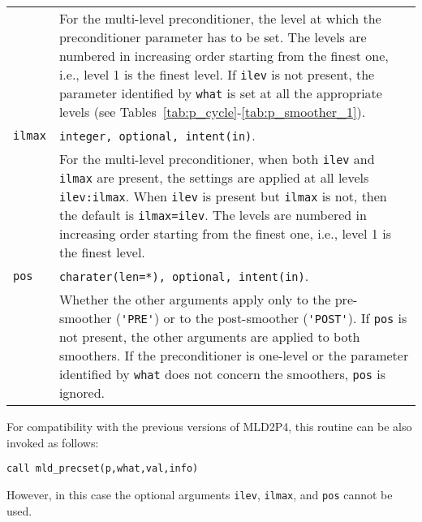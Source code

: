 \begin{tabular}{p{1.2cm}p{12cm}}
              & For the multi-level preconditioner, the level at which the
                preconditioner parameter has to be set.
                The levels are numbered in increasing
                order starting from the finest one, i.e., level 1 is the finest level.
                If \verb|ilev| is not present, the parameter identified by \verb|what|
                is set at all the appropriate levels (see
                Tables~\ref{tab:p_cycle}-\ref{tab:p_smoother_1}).\\
\verb|ilmax|   & \verb|integer, optional, intent(in)|.\\
              & For the multi-level preconditioner, when both
                \verb|ilev| and \verb|ilmax| are present, the settings
                are applied at all levels \verb|ilev:ilmax|. When
                \verb|ilev| is present but \verb|ilmax| is not, then
                the default is \verb|ilmax=ilev|.
                The levels are numbered in increasing
                order starting from the finest one, i.e., level 1 is the finest level. \\
\verb|pos|   & \verb|charater(len=*), optional, intent(in)|.\\
              & Whether the other arguments apply only to the pre-smoother (\verb|'PRE'|)
                or to the post-smoother (\verb|'POST'|). If \verb|pos| is not present,
                the other arguments are applied to both smoothers.
                If the preconditioner is one-level or the parameter identified by \verb|what|
                does not concern the smoothers, \verb|pos| is ignored.
\end{tabular}

\baselineskip
For compatibility with the previous versions of MLD2P4, this routine can be also invoked
as follows:

\begin{center}
\verb|call mld_precset(p,what,val,info)|
\end{center}

\noindent
However, in this case the optional arguments \verb|ilev|, \verb|ilmax|, and \verb|pos|
cannot be used. \\

